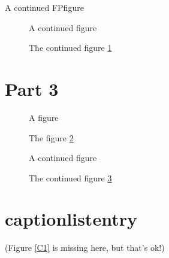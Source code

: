 \documentclass[a4paper]{article}
\begin{document}
\ifx\FPfigure\undefined \else
\begin{FPfigure}
\ContinuedFloat
 \centering A continued FPfigure
 \caption{The continued FPfigure \ref{FPcont1}}
 \label{FPcont1}
\end{FPfigure}
\fi

\begin{figure}[H]
\ContinuedFloat
\centering A continued figure
\caption{The continued figure \ref{cont1b}}
\label{cont1b}
\end{figure}

\clearpage
\section{Part 3}

\begin{figure}[H]
\ContinuedFloat*
\centering A figure
\caption{The figure \ref{figure2}}
\label{figure2}
\end{figure}

\begin{figure}[H]
\ContinuedFloat
\centering A continued figure
\caption{The continued figure \ref{cont2}}
\label{cont2}
\end{figure}

\clearpage
\section{captionlistentry}

\begin{minipage}\textwidth
\captionsetup{type=figure}
\caption{A1}
\end{minipage}

\begin{minipage}\textwidth
\captionsetup{type=figure}
\ContinuedFloat
\caption{A1 (cont.)}
\end{minipage}

\begin{minipage}\textwidth
{}
\end{minipage}


\begingroup
\captionsetup{type=figure}
\label{C1}
\endgroup
\begingroup
\captionsetup{type=figure}
\ContinuedFloat
{}
\endgroup
(Figure \ref*{C1} is missing here, but that's ok!)
\end{document}

